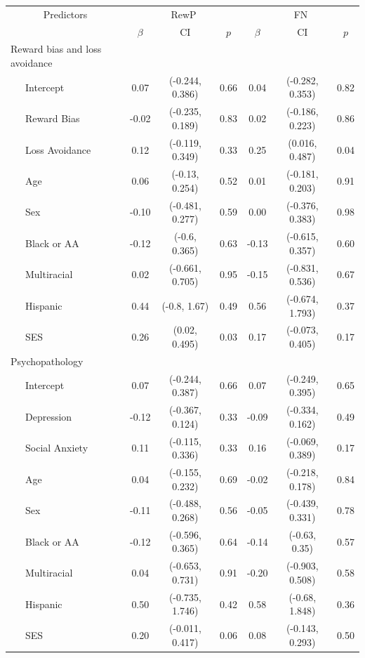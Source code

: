 \documentclass[english,man,floatsintext]{apa6}
\begin{document}
\begin{table}[tbp]
\begin{center}
\begin{threeparttable}
\begin{tabular}{lcccccc}
\toprule
 \multicolumn{1}{c}{Predictors} & \multicolumn{3}{c}{RewP} & \multicolumn{3}{c}{FN} \\
\cmidrule(r){1-1} \cmidrule(r){2-4} \cmidrule(r){5-7}
  & $\beta$ & CI & $p$ & $\beta$ & CI & $p$\\
\midrule
Reward bias and loss avoidance &  &  &  &  &  & \\
\ \ \ Intercept & 0.07 & (-0.244, 0.386) & 0.66 & 0.04 & (-0.282, 0.353) & 0.82\\
\ \ \ Reward Bias & -0.02 & (-0.235, 0.189) & 0.83 & 0.02 & (-0.186, 0.223) & 0.86\\
\ \ \ Loss Avoidance & 0.12 & (-0.119, 0.349) & 0.33 & 0.25 & (0.016, 0.487) & 0.04\\
\ \ \ Age & 0.06 & (-0.13, 0.254) & 0.52 & 0.01 & (-0.181, 0.203) & 0.91\\
\ \ \ Sex & -0.10 & (-0.481, 0.277) & 0.59 & 0.00 & (-0.376, 0.383) & 0.98\\
\ \ \ Black or AA & -0.12 & (-0.6, 0.365) & 0.63 & -0.13 & (-0.615, 0.357) & 0.60\\
\ \ \ Multiracial & 0.02 & (-0.661, 0.705) & 0.95 & -0.15 & (-0.831, 0.536) & 0.67\\
\ \ \ Hispanic & 0.44 & (-0.8, 1.67) & 0.49 & 0.56 & (-0.674, 1.793) & 0.37\\
\ \ \ SES & 0.26 & (0.02, 0.495) & 0.03 & 0.17 & (-0.073, 0.405) & 0.17\\
Psychopathology &  &  &  &  &  & \\
\ \ \ Intercept & 0.07 & (-0.244, 0.387) & 0.66 & 0.07 & (-0.249, 0.395) & 0.65\\
\ \ \ Depression & -0.12 & (-0.367, 0.124) & 0.33 & -0.09 & (-0.334, 0.162) & 0.49\\
\ \ \ Social Anxiety & 0.11 & (-0.115, 0.336) & 0.33 & 0.16 & (-0.069, 0.389) & 0.17\\
\ \ \ Age & 0.04 & (-0.155, 0.232) & 0.69 & -0.02 & (-0.218, 0.178) & 0.84\\
\ \ \ Sex & -0.11 & (-0.488, 0.268) & 0.56 & -0.05 & (-0.439, 0.331) & 0.78\\
\ \ \ Black or AA & -0.12 & (-0.596, 0.365) & 0.64 & -0.14 & (-0.63, 0.35) & 0.57\\
\ \ \ Multiracial & 0.04 & (-0.653, 0.731) & 0.91 & -0.20 & (-0.903, 0.508) & 0.58\\
\ \ \ Hispanic & 0.50 & (-0.735, 1.746) & 0.42 & 0.58 & (-0.68, 1.848) & 0.36\\
\ \ \ SES & 0.20 & (-0.011, 0.417) & 0.06 & 0.08 & (-0.143, 0.293) & 0.50\\
\bottomrule
\end{tabular}

\end{threeparttable}
\end{center}

\end{table}
\end{document}
